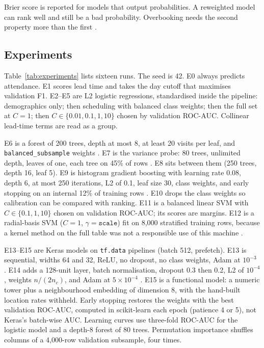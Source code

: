 \documentclass[journal]{IEEEtran}
\begin{document}
Brier score is reported for models that output probabilities. A reweighted model can rank well and still be a bad probability. Overbooking needs the second property more than the first \cite{huang2014}.

\subsection{Experiments}
Table~\ref{tab:experiments} lists sixteen runs. The seed is 42. E0 always predicts attendance. E1 scores lead time and takes the day cutoff that maximises validation F1. E2--E5 are L2 logistic regressions, standardised inside the pipeline: demographics only; then scheduling with balanced class weights; then the full set at $C=1$; then $C \in \{0.01,0.1,1,10\}$ chosen by validation ROC-AUC. Collinear lead-time terms are read as a group.

E6 is a forest of 200 trees, depth at most 8, at least 20 visits per leaf, and \texttt{balanced\_subsample} weights \cite{breiman2001}. E7 is the variance probe: 80 trees, unlimited depth, leaves of one, each tree on 45\% of rows \cite{geman1992}. E8 sits between them (250 trees, depth 16, leaf 5). E9 is histogram gradient boosting with learning rate 0.08, depth 6, at most 250 iterations, L2 of 0.1, leaf size 30, class weights, and early stopping on an internal 12\% of training rows \cite{friedman2001}. E10 drops the class weights so calibration can be compared with ranking. E11 is a balanced linear SVM with $C \in \{0.1,1,10\}$ chosen on validation ROC-AUC; its scores are margins. E12 is a radial-basis SVM ($C=1$, $\gamma=\texttt{scale}$) fit on 8{,}000 stratified training rows, because a kernel method on the full table was not a responsible use of this machine \cite{cortes1995}.

E13--E15 are Keras models on \texttt{tf.data} pipelines (batch 512, prefetch). E13 is sequential, widths 64 and 32, ReLU, no dropout, no class weights, Adam at $10^{-3}$ \cite{kingma2015}. E14 adds a 128-unit layer, batch normalisation, dropout 0.3 then 0.2, L2 of $10^{-4}$, weights $n/(2n_c)$, and Adam at $5\times 10^{-4}$ \cite{ioffe2015,srivastava2014}. E15 is a functional model: a numeric tower plus a neighbourhood embedding of dimension 8, with the hand-built location rates withheld. Early stopping restores the weights with the best validation ROC-AUC, computed in scikit-learn each epoch (patience 4 or 5), not Keras's batch-wise AUC. Learning curves use three-fold ROC-AUC for the logistic model and a depth-8 forest of 80 trees. Permutation importance shuffles columns of a 4{,}000-row validation subsample, four times.
\end{document}
